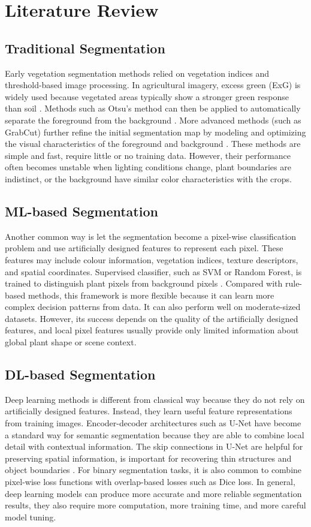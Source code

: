 \documentclass[conference]{IEEEtran}
\begin{document}
\section{Literature Review}

\subsection{Traditional Segmentation}
Early vegetation segmentation methods relied on vegetation indices and threshold-based image processing. In agricultural imagery, excess green (ExG) is widely used because vegetated areas typically show a stronger green response than soil \cite{exg}. Methods such as Otsu’s method can then be applied to automatically separate the foreground from the background \cite{otsu_analysis}. More advanced methods (such as GrabCut) further refine the initial segmentation map by modeling and optimizing the visual characteristics of the foreground and background \cite{grabcut}. These methods are simple and fast, require little or no training data. However, their performance often becomes unstable when lighting conditions change, plant boundaries are indistinct, or the background have similar color characteristics with the crops. 


\subsection{ML-based Segmentation}
Another common way is let the segmentation become a pixel-wise classification problem and use artificially designed features to represent each pixel. These features may include colour information, vegetation indices, texture descriptors, and spatial coordinates. Supervised classifier, such as SVM or Random Forest, is trained to distinguish plant pixels from background pixels \cite{svm, rf}. Compared with rule-based methods, this framework is more flexible because it can learn more complex decision patterns from data. It can also perform well on moderate-sized datasets. However, its success depends on the quality of the artificially designed features, and local pixel features usually provide only limited information about global plant shape or scene context. 


\subsection{DL-based Segmentation}
Deep learning methods is different from classical way because they do not rely on artificially designed features. Instead, they learn useful feature representations from training images. Encoder-decoder architectures such as U-Net have become a standard way for semantic segmentation because they are able to combine local detail with contextual information. The skip connections in U-Net are helpful for preserving spatial information, is important for recovering thin structures and object boundaries \cite{unet}. For binary segmentation tasks, it is also common to combine pixel-wise loss functions with overlap-based losses such as Dice loss. In general, deep learning models can produce more accurate and more reliable segmentation results, they also require more computation, more training time, and more careful model tuning. 
\end{document}
